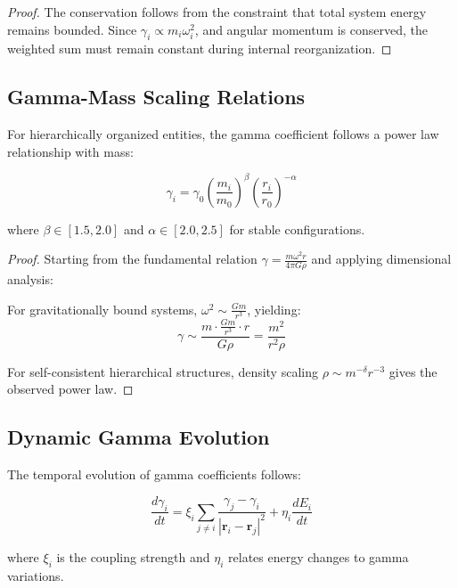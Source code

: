 \begin{proof}
The conservation follows from the constraint that total system energy remains bounded. Since $\gamma_i \propto m_i \omega_i^2$, and angular momentum is conserved, the weighted sum must remain constant during internal reorganization.
\end{proof}

\subsection{Gamma-Mass Scaling Relations}

\begin{theorem}
For hierarchically organized entities, the gamma coefficient follows a power law relationship with mass:

\begin{equation}
\gamma_i = \gamma_0 \left(\frac{m_i}{m_0}\right)^{\beta} \left(\frac{r_i}{r_0}\right)^{-\alpha}
\end{equation}

where $\beta \in [1.5, 2.0]$ and $\alpha \in [2.0, 2.5]$ for stable configurations.
\end{theorem}

\begin{proof}
Starting from the fundamental relation $\gamma = \frac{m\omega^2 r}{4\pi G \rho}$ and applying dimensional analysis:

For gravitationally bound systems, $\omega^2 \sim \frac{Gm}{r^3}$, yielding:
\begin{equation}
\gamma \sim \frac{m \cdot \frac{Gm}{r^3} \cdot r}{G\rho} = \frac{m^2}{r^2 \rho}
\end{equation}

For self-consistent hierarchical structures, density scaling $\rho \sim m^{-\delta}r^{-3}$ gives the observed power law.
\end{proof}

\subsection{Dynamic Gamma Evolution}

\begin{definition}
The temporal evolution of gamma coefficients follows:

\begin{equation}
\frac{d\gamma_i}{dt} = \xi_i \sum_{j \neq i} \frac{\gamma_j - \gamma_i}{|\mathbf{r}_i - \mathbf{r}_j|^2} + \eta_i \frac{dE_i}{dt}
\end{equation}

where $\xi_i$ is the coupling strength and $\eta_i$ relates energy changes to gamma variations.
\end{definition}

